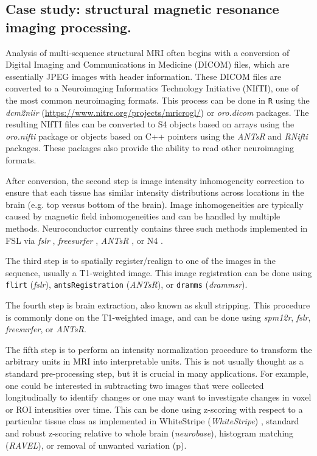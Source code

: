 \documentclass[]{elsarticle} %
\newcommand{\code}[1]{\texttt{#1}}
\newcommand{\pkg}[1]{\emph{#1}}
\begin{document}
\subsection{Case study: structural magnetic resonance imaging processing.} Analysis of multi-sequence structural MRI often begins with a conversion of Digital Imaging and Communications in Medicine (DICOM) files, which are essentially JPEG images with header information.  These DICOM files are converted to a Neuroimaging Informatics Technology Initiative (NIfTI), one of the most common neuroimaging formats. This process can be done in \verb"R" using the \pkg{dcm2niir} (\url{https://www.nitrc.org/projects/mricrogl/}) or \pkg{oro.dicom} \cite{dicom_nifti} packages. The resulting NIfTI files can be converted to S4 objects based on arrays using the \pkg{oro.nifti} \cite{oro.nifti} package or objects based on C++ pointers using the \pkg{ANTsR} \cite{antsr} and \pkg{RNifti} \cite{Rnifti} packages.  These packages also provide the ability to read other neuroimaging formats.

After conversion, the second step is image intensity inhomogeneity correction to ensure that each tissue has similar intensity distributions across locations in the brain (e.g. top versus bottom of the brain). Image inhomogeneities are typically caused by magnetic field inhomogeneities and can be handled by multiple methods. Neuroconductor currently contains three such methods implemented in FSL  via \pkg{fslr} \cite{zhang_segmentation_2001},  \pkg{freesurfer} \cite{sled_nonparametric_1998}, \pkg{ANTsR} \cite{sled_nonparametric_1998}, or N4 \cite{tustison_n4itk:_2010}.  

The third step is to spatially register/realign to one of the images in the sequence, usually a T1-weighted image.  This image registration can be done using \code{flirt} (\pkg{fslr}), \code{antsRegistration} (\pkg{ANTsR}), or \code{dramms} (\pkg{drammsr}).

The fourth step is brain extraction, also known as skull stripping.  This procedure is commonly done on the T1-weighted image, and can be done using \pkg{spm12r}, \pkg{fslr}, \pkg{freesurfer}, or \pkg{ANTsR}.

The fifth step is to perform an intensity normalization procedure to transform the arbitrary units in MRI into interpretable units. This is not usually thought as a standard pre-processing step, but it is crucial in many applications. For example, one could be interested in subtracting two images that were collected longitudinally to identify changes or one may want to investigate changes in voxel or ROI intensities over time.  This can be done using z-scoring with respect to a particular tissue class as implemented in WhiteStripe (\pkg{WhiteStripe}) \citep{whitestripe}, standard and robust z-scoring relative to whole brain (\pkg{neurobase}), histogram matching  (\pkg{RAVEL}), or removal of unwanted variation (p).  
\end{document}
